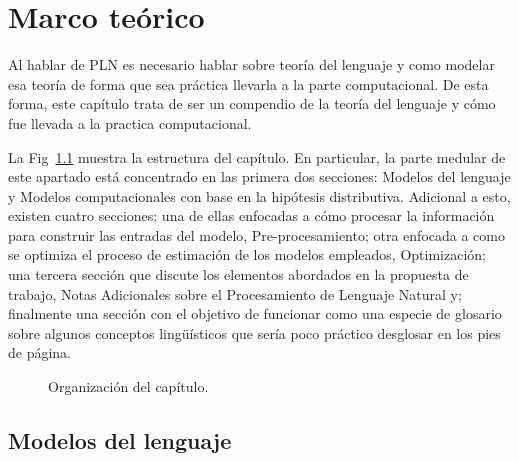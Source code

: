 \chapter{Marco teórico}
\label{ch:chap2}

Al hablar de PLN es necesario hablar sobre teoría del lenguaje y como modelar esa teoría de forma que sea práctica llevarla a la parte computacional. De esta forma, este capítulo trata de ser un compendio de la teoría del lenguaje y cómo fue llevada a la practica computacional.

La Fig~\ref{fig:ch2} muestra la estructura del capítulo. En particular, la parte medular de este apartado está concentrado en las primera dos secciones: Modelos del lenguaje y Modelos computacionales con base en la hipótesis distributiva. Adicional a esto, existen cuatro secciones: una de ellas enfocadas a cómo procesar la información para construir las entradas del modelo, Pre-procesamiento; otra enfocada a como se optimiza el proceso de estimación de los modelos empleados, Optimización; una tercera sección que discute los elementos abordados en la propuesta de trabajo, Notas Adicionales sobre el Procesamiento de Lenguaje Natural y; finalmente una sección con el objetivo de funcionar como una especie de glosario sobre algunos conceptos lingüísticos que sería poco práctico desglosar en los pies de página.

\begin{figure}[h]
	\centering
	\caption{Organización del capítulo.}
	\label{fig:ch2}
\end{figure}


\section{Modelos del lenguaje}
\label{sec:sec21}

